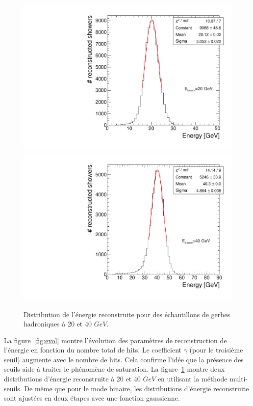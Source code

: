 \begin{figure}[!ht]
  \begin{center}
    \includegraphics[width=.45\textwidth]{SDHCAL/figs/gfit-en-20.pdf}
    \includegraphics[width=.45\textwidth]{SDHCAL/figs/gfit-en-40.pdf}
    \caption{Distribution de l'énergie reconstruite pour des échantillons de gerbes hadroniques à 20 et 40 $GeV$.}%
    \label{fig:energy_dist_sd}
  \end{center}
\end{figure}
La figure~\ref{fig:evol} montre l'évolution des paramètres de reconstruction de l'énergie en fonction du nombre total de hits. Le coefficient $\gamma$ (pour le troisième seuil) augmente avec le nombre de hits. Cela confirme l'idée que la présence des seuils aide à traiter le phénomène de saturation. 
La figure~\ref{fig:energy_dist_sd} montre deux distributions d'énergie reconstruite à 20 et 40 $GeV$ en utilisant la méthode multi-seuils. De même que pour le mode binaire, les distributions d'énergie reconstruite sont ajustées en deux étapes avec une fonction gaussienne. 
